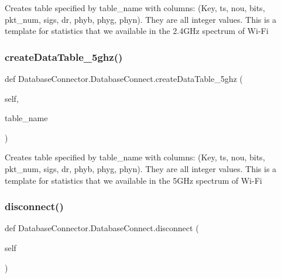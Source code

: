 \begin{DoxyVerb}Creates table specified by table_name with columns: (Key, ts, nou, bits, pkt_num, sigs, dr, phyb, phyg, phyn). They are all integer values.
This is a template for statistics that we available in the 2.4GHz spectrum of Wi-Fi\end{DoxyVerb}
 \mbox{\label{classDatabaseConnector_1_1DatabaseConnect_a196df8f48a469a71b10192b98529ca3f}} 
\subsubsection{\texorpdfstring{create\+Data\+Table\+\_\+5ghz()}{createDataTable\_5ghz()}}
{\footnotesize\ttfamily def Database\+Connector.\+Database\+Connect.\+create\+Data\+Table\+\_\+5ghz (\begin{DoxyParamCaption}\item[{}]{self,  }\item[{}]{table\+\_\+name }\end{DoxyParamCaption})}

\begin{DoxyVerb}Creates table specified by table_name with columns: (Key, ts, nou, bits, pkt_num, sigs, dr, phyb, phyg, phyn). They are all integer values.
This is a template for statistics that we available in the 5GHz spectrum of Wi-Fi\end{DoxyVerb}
 \mbox{\label{classDatabaseConnector_1_1DatabaseConnect_aeb9d5d3e55d60d137d938c8ba6f696b7}} 
\subsubsection{\texorpdfstring{disconnect()}{disconnect()}}
{\footnotesize\ttfamily def Database\+Connector.\+Database\+Connect.\+disconnect (\begin{DoxyParamCaption}\item[{}]{self }\end{DoxyParamCaption})}

